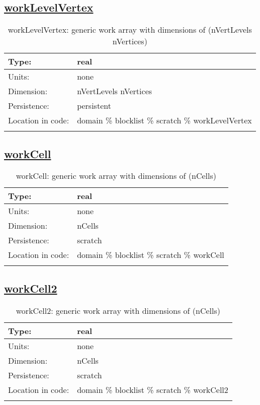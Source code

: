 \subsection[workLevelVertex]{\hyperref[sec:var_tab_scratch]{workLevelVertex}}
\label{subsec:var_sec_scratch_workLevelVertex}
\begin{center}
\begin{longtable}{| p{2.0in} | p{4.0in} |}
        \hline 
        Type: & real \\
        \hline 
        Units: & \si{none} \\
        \hline 
        Dimension: & nVertLevels nVertices \\
        \hline 
        Persistence: & persistent \\
        \hline 
         Location in code: & domain \% blocklist \% scratch \% workLevelVertex \\
         \hline 
    \caption{workLevelVertex: generic work array with dimensions of (nVertLevels nVertices)}
\end{longtable}
\end{center}
\subsection[workCell]{\hyperref[sec:var_tab_scratch]{workCell}}
\label{subsec:var_sec_scratch_workCell}
\begin{center}
\begin{longtable}{| p{2.0in} | p{4.0in} |}
        \hline 
        Type: & real \\
        \hline 
        Units: & \si{none} \\
        \hline 
        Dimension: & nCells \\
        \hline 
        Persistence: & scratch \\
        \hline 
         Location in code: & domain \% blocklist \% scratch \% workCell \\
         \hline 
    \caption{workCell: generic work array with dimensions of (nCells)}
\end{longtable}
\end{center}
\subsection[workCell2]{\hyperref[sec:var_tab_scratch]{workCell2}}
\label{subsec:var_sec_scratch_workCell2}
\begin{center}
\begin{longtable}{| p{2.0in} | p{4.0in} |}
        \hline 
        Type: & real \\
        \hline 
        Units: & \si{none} \\
        \hline 
        Dimension: & nCells \\
        \hline 
        Persistence: & scratch \\
        \hline 
         Location in code: & domain \% blocklist \% scratch \% workCell2 \\
         \hline 
    \caption{workCell2: generic work array with dimensions of (nCells)}
\end{longtable}
\end{center}
